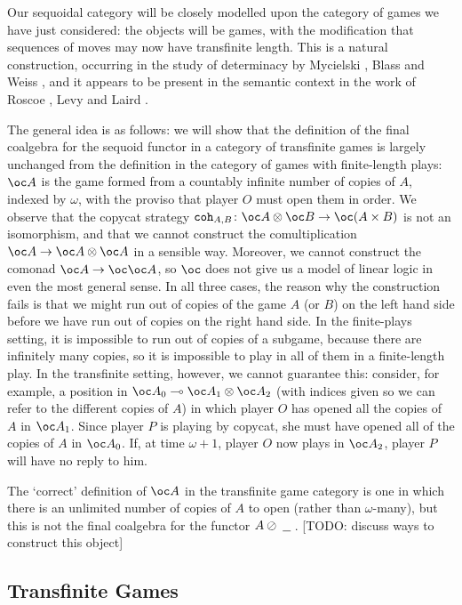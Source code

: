 \documentclass[a4paper,UKenglish]{lipics-v2016}
\theoremstyle{plain}
\theoremstyle{definition}
\newcommand*\from{\colon}
\newcommand{\tensor}{\otimes}
\newcommand{\sequoid}{\oslash}
\renewcommand{\implies}{\multimap}
\newcommand{\blank}{\;\underline{\hspace{1.5ex}}\;}
\renewcommand{\int}{{\mathtt{coh}}}
\begin{document}
Our sequoidal category will be closely modelled upon the category of games we have just considered: the objects will be games, with the modification that sequences of moves may now have transfinite length.  This is a natural construction, occurring in the study of determinacy by Mycielski \cite{mycielskiChoice}, Blass \cite{blassChoice} and Weiss \cite{longgamesbook}, and it appears to be present in the semantic context in the work of Roscoe \cite{RoscoeCspInfinite}, Levy \cite{LevyGsInfinite} and Laird \cite{LairdOrdinalGames}.  

The general idea is as follows: we will show that the definition of the final coalgebra for the sequoid functor in a category of transfinite games is largely unchanged from the definition in the category of games with finite-length plays: $\oc A$ is the game formed from a countably infinite number of copies of $A$, indexed by $\omega$, with the proviso that player $O$ must open them in order.  We observe that the copycat strategy $\int_{A,B}\from\oc A\tensor\oc B\to \oc(A\times B)$ is not an isomorphism, and that we cannot construct the comultiplication $\oc A \to \oc A \tensor \oc A$ in a sensible way.  Moreover, we cannot construct the comonad $\oc A \to \oc \oc A$, so $\oc$ does not give us a model of linear logic in even the most general sense.  In all three cases, the reason why the construction fails is that we might run out of copies of the game $A$ (or $B$) on the left hand side before we have run out of copies on the right hand side.  In the finite-plays setting, it is impossible to run out of copies of a subgame, because there are infinitely many copies, so it is impossible to play in all of them in a finite-length play.  In the transfinite setting, however, we cannot guarantee this: consider, for example, a position in $\oc A_0 \implies \oc A_1 \tensor \oc A_2$ (with indices given so we can refer to the different copies of $A$) in which player $O$ has opened all the copies of $A$ in $\oc A_1$.  Since player $P$ is playing by copycat, she must have opened all of the copies of $A$ in $\oc A_0$.  If, at time $\omega+1$, player $O$ now plays in $\oc A_2$, player $P$ will have no reply to him.

The `correct' definition of $\oc A$ in the transfinite game category is one in which there is an unlimited number of copies of $A$ to open (rather than $\omega$-many), but this is not the final coalgebra for the functor $A\sequoid\blank$.  [TODO: discuss ways to construct this object]

\subsection{Transfinite Games}
\end{document}
